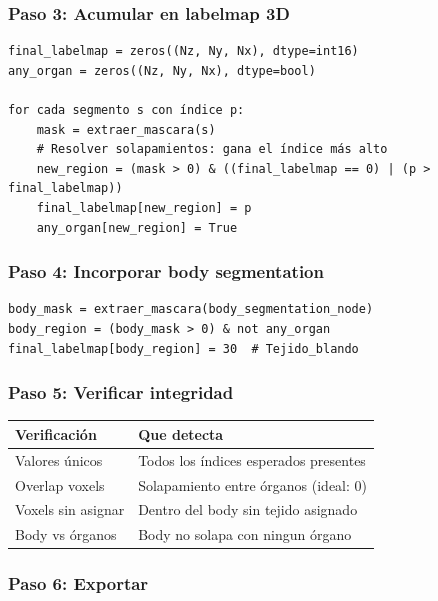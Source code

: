 \documentclass[12pt,a4paper]{article}
\begin{document}
\subsubsection{Paso 3: Acumular en labelmap 3D}

\begin{lstlisting}
final_labelmap = zeros((Nz, Ny, Nx), dtype=int16)
any_organ = zeros((Nz, Ny, Nx), dtype=bool)

for cada segmento s con índice p:
    mask = extraer_mascara(s)
    # Resolver solapamientos: gana el índice más alto
    new_region = (mask > 0) & ((final_labelmap == 0) | (p > final_labelmap))
    final_labelmap[new_region] = p
    any_organ[new_region] = True
\end{lstlisting}

\subsubsection{Paso 4: Incorporar body segmentation}

\begin{lstlisting}
body_mask = extraer_mascara(body_segmentation_node)
body_region = (body_mask > 0) & not any_organ
final_labelmap[body_region] = 30  # Tejido_blando
\end{lstlisting}

\subsubsection{Paso 5: Verificar integridad}

\begin{table}[H]
\centering
\begin{tabular}{l l}
\toprule
\textbf{Verificación} & \textbf{Que detecta} \\
\midrule
Valores únicos & Todos los índices esperados presentes \\
Overlap voxels & Solapamiento entre órganos (ideal: 0) \\
Voxels sin asignar & Dentro del body sin tejido asignado \\
Body vs órganos & Body no solapa con ningun órgano \\
\bottomrule
\end{tabular}
\end{table}

\subsubsection{Paso 6: Exportar}
\end{document}
